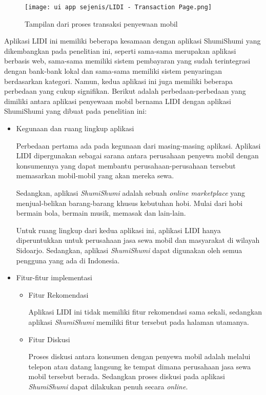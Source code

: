 \documentclass[a4paper]{article}
\begin{document}
\begin{enumerate}
    \begin{figure}[h]
        \centering
        \texttt{[image: ui app sejenis/LIDI - Transaction Page.png]}
        \caption{Tampilan dari proses transaksi penyewaan mobil}
    \end{figure}

    Aplikasi LIDI ini memiliki beberapa kesamaan dengan aplikasi ShumiShumi yang dikembangkan pada penelitian ini, seperti sama-sama merupakan aplikasi berbasis web, sama-sama memiliki sistem pembayaran yang sudah terintegrasi dengan bank-bank lokal dan sama-sama memiliki sistem penyaringan berdasarkan kategori. Namun, kedua aplikasi ini juga memiliki beberapa perbedaan yang cukup signifikan. Berikut adalah perbedaan-perbedaan yang dimiliki antara aplikasi penyewaan mobil bernama LIDI dengan aplikasi ShumiShumi yang dibuat pada penelitian ini:

    \begin{itemize}
        \item Kegunaan dan ruang lingkup aplikasi

        Perbedaan pertama ada pada kegunaan dari masing-masing aplikasi. Aplikasi LIDI dipergunakan sebagai sarana antara perusahaan penyewa mobil dengan konsumennya yang dapat membantu perusahaan-perusahaan tersebut memasarkan mobil-mobil yang akan mereka sewa.

        Sedangkan, aplikasi \textit{ShumiShumi} adalah sebuah \textit{online marketplace} yang menjual-belikan barang-barang khusus kebutuhan hobi. Mulai dari hobi bermain bola, bermain musik, memasak dan lain-lain.

        Untuk ruang lingkup dari kedua aplikasi ini, aplikasi LIDI hanya diperuntukkan untuk perusahaan jasa sewa mobil dan masyarakat di wilayah Sidoarjo. Sedangkan, aplikasi \textit{ShumiShumi} dapat digunakan oleh semua pengguna yang ada di Indonesia.

        \item Fitur-fitur implementasi

        \begin{itemize}
            \item Fitur Rekomendasi

            Aplikasi LIDI ini tidak memiliki fitur rekomendasi sama sekali, sedangkan aplikasi \textit{ShumiShumi} memiliki fitur tersebut pada halaman utamanya.

            \item Fitur Diskusi

            Proses diskusi antara konsumen dengan penyewa mobil adalah melalui telepon atau datang langsung ke tempat dimana perusahaan jasa sewa mobil tersebut berada. Sedangkan proses diskusi pada aplikasi \textit{ShumiShumi} dapat dilakukan penuh secara \textit{online}.


\end{itemize}
\end{itemize}
\end{enumerate}
\end{document}

